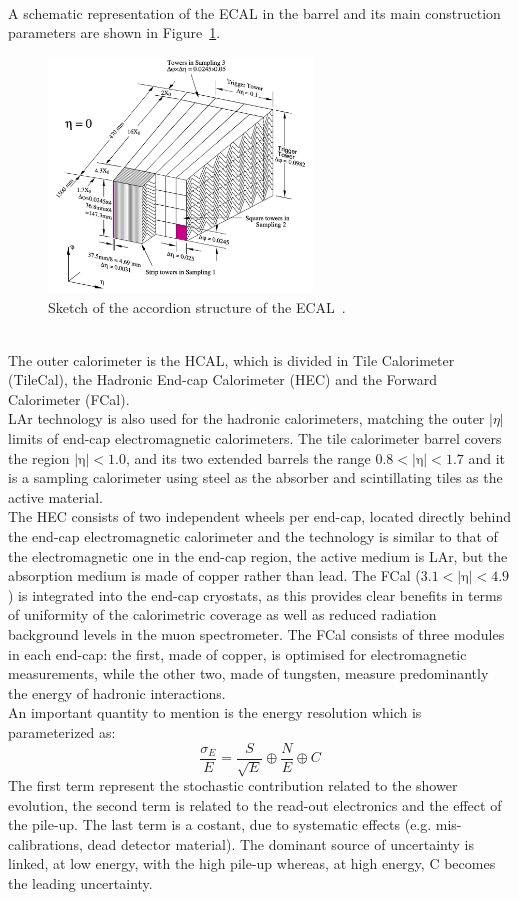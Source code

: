 \\A schematic representation of the ECAL in the barrel and its main construction parameters are shown in Figure~\ref{fig:ECAL}. 
\begin{figure}[h]
	\centering
	\includegraphics[width=7cm]{Chapters/CH2/figures/ECAL}
	\caption{Sketch of the accordion structure of the ECAL~\cite{cal}.}
	\label{fig:ECAL}
\end{figure}
\vspace{\baselineskip}
\\The outer calorimeter is the HCAL, which is divided in Tile Calorimeter (TileCal), the Hadronic End-cap Calorimeter (HEC) and the Forward Calorimeter (FCal). \\
LAr technology is also used for the hadronic calorimeters, matching the outer $|\eta|$ limits of end-cap electromagnetic calorimeters. 
The tile calorimeter barrel covers the region $\mathrm{|\eta|<1.0}$, and its two extended barrels the range $\mathrm{0.8<|\eta|<1.7}$ and it is a sampling calorimeter 
using steel as the absorber and scintillating tiles as the active material.\\
The HEC consists of two independent wheels per end-cap, located directly behind the end-cap electromagnetic calorimeter and the technology is similar to that of the 
electromagnetic one in the end-cap region, the active medium is LAr, but the absorption medium is made of copper rather than lead.
The FCal ($\mathrm{3.1<|\eta|<4.9}$) is integrated into the end-cap cryostats, as this provides clear benefits in terms of uniformity of the calorimetric coverage as well as reduced radiation background levels in 
the muon spectrometer. The FCal consists of three modules in each end-cap: the first, made of copper, is optimised for electromagnetic measurements, while the other two, made of tungsten, measure 
predominantly the energy of hadronic interactions.\\
An important quantity to mention is the energy resolution which is parameterized as:
\begin{equation}
\frac{\sigma_{E}}{E}=\frac{S}{\sqrt{E}} \oplus \frac{N}{E} \oplus C
\end{equation}
The first term represent the stochastic contribution related to the shower evolution, the second term
is related to the read-out electronics and the effect of the pile-up. The last term is a costant, due to systematic effects (e.g. mis-calibrations, dead detector material). 
The dominant source of uncertainty is linked, at low energy, with the high pile-up whereas, at high energy, C becomes the leading uncertainty. 

